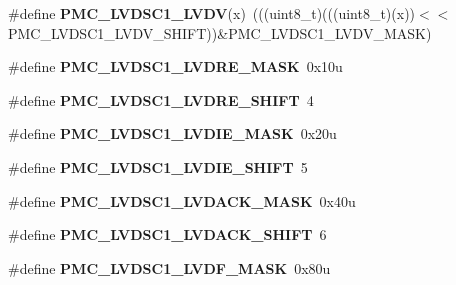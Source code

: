 \begin{DoxyCompactItemize}
\item 
\#define {\bfseries P\+M\+C\+\_\+\+L\+V\+D\+S\+C1\+\_\+\+L\+V\+DV}(x)~(((uint8\+\_\+t)(((uint8\+\_\+t)(x))$<$$<$P\+M\+C\+\_\+\+L\+V\+D\+S\+C1\+\_\+\+L\+V\+D\+V\+\_\+\+S\+H\+I\+FT))\&P\+M\+C\+\_\+\+L\+V\+D\+S\+C1\+\_\+\+L\+V\+D\+V\+\_\+\+M\+A\+SK)\hypertarget{group__PMC__Register__Masks_gae2cf4048ec29cc1a54349d8bc18e27e4}{}\label{group__PMC__Register__Masks_gae2cf4048ec29cc1a54349d8bc18e27e4}

\item 
\#define {\bfseries P\+M\+C\+\_\+\+L\+V\+D\+S\+C1\+\_\+\+L\+V\+D\+R\+E\+\_\+\+M\+A\+SK}~0x10u\hypertarget{group__PMC__Register__Masks_gad771f87e373907e3ef60e5fa31001fad}{}\label{group__PMC__Register__Masks_gad771f87e373907e3ef60e5fa31001fad}

\item 
\#define {\bfseries P\+M\+C\+\_\+\+L\+V\+D\+S\+C1\+\_\+\+L\+V\+D\+R\+E\+\_\+\+S\+H\+I\+FT}~4\hypertarget{group__PMC__Register__Masks_ga056ca878a20782f5bf65b3be3e98581d}{}\label{group__PMC__Register__Masks_ga056ca878a20782f5bf65b3be3e98581d}

\item 
\#define {\bfseries P\+M\+C\+\_\+\+L\+V\+D\+S\+C1\+\_\+\+L\+V\+D\+I\+E\+\_\+\+M\+A\+SK}~0x20u\hypertarget{group__PMC__Register__Masks_ga1e7518c88ea0037d099124a643788363}{}\label{group__PMC__Register__Masks_ga1e7518c88ea0037d099124a643788363}

\item 
\#define {\bfseries P\+M\+C\+\_\+\+L\+V\+D\+S\+C1\+\_\+\+L\+V\+D\+I\+E\+\_\+\+S\+H\+I\+FT}~5\hypertarget{group__PMC__Register__Masks_ga30ca240c9254a7e76123a3cf2bfdc40e}{}\label{group__PMC__Register__Masks_ga30ca240c9254a7e76123a3cf2bfdc40e}

\item 
\#define {\bfseries P\+M\+C\+\_\+\+L\+V\+D\+S\+C1\+\_\+\+L\+V\+D\+A\+C\+K\+\_\+\+M\+A\+SK}~0x40u\hypertarget{group__PMC__Register__Masks_ga65d04677ca16ad916563d6673cb8ecaa}{}\label{group__PMC__Register__Masks_ga65d04677ca16ad916563d6673cb8ecaa}

\item 
\#define {\bfseries P\+M\+C\+\_\+\+L\+V\+D\+S\+C1\+\_\+\+L\+V\+D\+A\+C\+K\+\_\+\+S\+H\+I\+FT}~6\hypertarget{group__PMC__Register__Masks_ga56654042b7934ca0e6c51f21db7d1201}{}\label{group__PMC__Register__Masks_ga56654042b7934ca0e6c51f21db7d1201}

\item 
\#define {\bfseries P\+M\+C\+\_\+\+L\+V\+D\+S\+C1\+\_\+\+L\+V\+D\+F\+\_\+\+M\+A\+SK}~0x80u\hypertarget{group__PMC__Register__Masks_ga44ae12d2d3e732cd25a897092a7e9ada}{}\label{group__PMC__Register__Masks_ga44ae12d2d3e732cd25a897092a7e9ada}


\end{DoxyCompactItemize}
